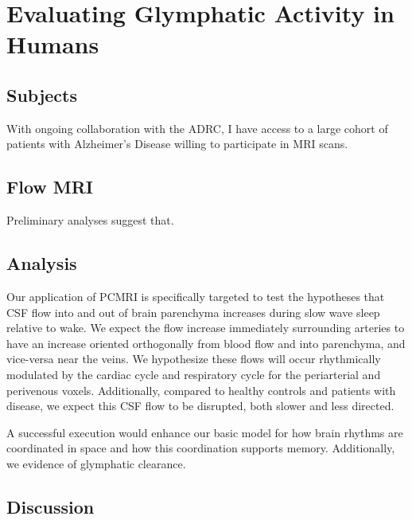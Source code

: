 \section*{Evaluating Glymphatic Activity in Humans}

\subsection*{Subjects}
With ongoing collaboration with the ADRC, I have access to a large cohort of patients with Alzheimer's Disease willing to participate in MRI scans.

\subsection*{Flow MRI}
Preliminary analyses suggest that. 

\subsection*{Analysis}
Our application of PCMRI is specifically targeted to test the hypotheses that CSF flow into and out of brain parenchyma increases during slow wave sleep relative to wake. We expect the flow increase immediately surrounding arteries to have an increase oriented orthogonally from blood flow and into parenchyma, and vice-versa near the veins. We hypothesize these flows will occur rhythmically modulated by the cardiac cycle and respiratory cycle for the periarterial and perivenous voxels. Additionally, compared to healthy controls and patients with disease, we expect this CSF flow to be disrupted, both slower and less directed.

A successful execution would enhance our basic model for how brain rhythms are coordinated in space and how this coordination supports memory. Additionally, we evidence of glymphatic clearance.

\subsection*{Discussion}




